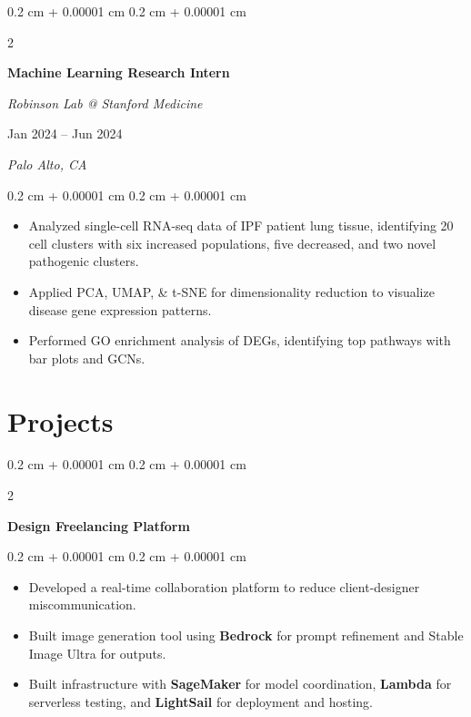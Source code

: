 \documentclass[10pt, letterpaper]{article}
\newenvironment{highlights}{
    \begin{itemize}[
        topsep=0.10 cm,
        parsep=0.10 cm,
        partopsep=0pt,
        itemsep=0pt,
        leftmargin=0.4 cm + 10pt
    ]
}{
    \end{itemize}
} %
\newenvironment{onecolentry}{
    \begin{adjustwidth}{
        0.2 cm + 0.00001 cm
    }{
        0.2 cm + 0.00001 cm
    }
}{
    \end{adjustwidth}
} %
\newenvironment{twocolentry}[2][]{
    \onecolentry
    \def\secondColumn{#2}
    \setcolumnwidth{\fill, 6.5 cm}
    \begin{paracol}{2}
}{
    \switchcolumn \raggedleft \secondColumn
    \end{paracol}
    \endonecolentry
} %
\let\hrefWithoutArrow\href
\renewcommand{\href}[2]{\hrefWithoutArrow{#1}{\ifthenelse{\equal{#2}{}}{ }{#2 }\raisebox{.15ex}{\footnotesize \faExternalLink*}}}
\begin{document}
        \vspace{0.2 cm}

        \begin{twocolentry}{
        Jan 2024 -- Jun 2024    
            
        \textit{Palo Alto, CA}}
            \textbf{Machine Learning Research Intern}
            
            \textit{Robinson Lab @ Stanford Medicine \href{https://drive.google.com/file/d/1cgRNPQy-6pXMvyiAH8pL8GQbGyIG8JlY/view?usp=sharing}{}}
        \end{twocolentry}

        \vspace{0.10 cm}
        \begin{onecolentry}
            \begin{highlights}
                \item Analyzed single-cell RNA-seq data of IPF patient lung tissue, identifying 20 cell clusters with six increased populations, five decreased, and two novel pathogenic clusters.
                \item Applied PCA, UMAP, \& t-SNE for dimensionality reduction to visualize disease gene expression patterns.
                \item Performed GO enrichment analysis of DEGs, identifying top pathways with bar plots and GCNs.
            \end{highlights}
        \end{onecolentry}

    
    \section{Projects}
        
        \begin{twocolentry}{}
            \textbf{Design Freelancing Platform
            \href{https://github.com/rob-9/echo}{}}
        \end{twocolentry}

        \vspace{0.10 cm}
        \begin{onecolentry}
            \begin{highlights}
                \item Developed a real-time collaboration platform to reduce client-designer miscommunication.
                \item Built image generation tool using \textbf{Bedrock} for prompt refinement and Stable Image Ultra for outputs.
                \item Built infrastructure with \textbf{SageMaker} for model coordination, \textbf{Lambda} for serverless testing, and \textbf{LightSail} for deployment and hosting.
            \end{highlights}
        \end{onecolentry}
\end{document}

